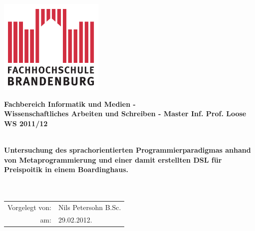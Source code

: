 \titlepage

\begin{center}
\includegraphics[width=5cm]{pics/FH-Logo}\vspace{0.5cm}

\par\end{center}

\noindent \begin{center}
\textsf{\textbf{\Large Fachbereich Informatik und Medien - \\
Wissenschaftliches Arbeiten und Schreiben - Master Inf. Prof. Loose
WS 2011/12}}\\ \textsf{\large }\\
\vspace{1cm}

\par\end{center}

\begin{center}
\textsf{\textbf{\huge Untersuchung des sprachorientierten
Programmierparadigmas anhand von Metaprogrammierung und einer damit
erstellten DSL für Preispoitik in einem Boardinghaus.\\
}}\textsf{}\\ \textsf{}\\ 

\par\end{center}{\Large \par}

\vspace{2cm}


\noindent \begin{center}
{\huge }\begin{tabular}{rl}
Vorgelegt von: & Nils Petersohn B.Sc. \tabularnewline am: &
29.02.2012.\tabularnewline
\end{tabular}
\par\end{center}{\huge \par}

